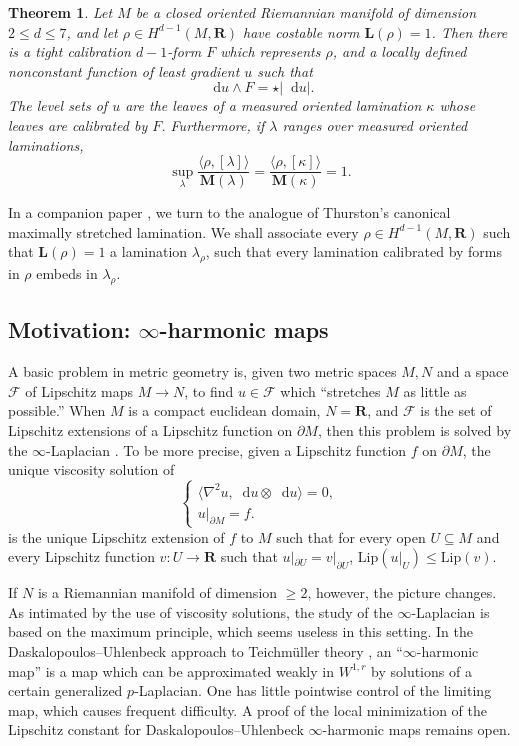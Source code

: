 \documentclass[reqno,11pt]{amsart}
\newcommand{\RR}{\mathbf{R}}
\newcommand*\dif{\mathop{}\!\mathrm{d}}
\newcommand{\Lip}{\mathrm{Lip}}
\newcommand{\Mass}{\mathbf M}
\newcommand{\Comass}{\mathbf L}
\newtheorem{theorem}{Theorem}[section]
\theoremstyle{definition}
\numberwithin{equation}{section}
\begin{document}
\begin{theorem}
Let $M$ be a closed oriented Riemannian manifold of dimension $2 \leq d \leq 7$, and let $\rho \in H^{d - 1}(M, \RR)$ have costable norm $\Comass(\rho) = 1$.
Then there is a tight calibration $d - 1$-form $F$ which represents $\rho$, and a locally defined nonconstant function of least gradient $u$ such that 
$$\dif u \wedge F = \star |\dif u|.$$
The level sets of $u$ are the leaves of a measured oriented lamination $\kappa$ whose leaves are calibrated by $F$.
Furthermore, if $\lambda$ ranges over measured oriented laminations, 
$$\sup_\lambda \frac{\langle \rho, [\lambda]\rangle}{\Mass(\lambda)} = \frac{\langle \rho, [\kappa]\rangle}{\Mass(\kappa)} = 1.$$
\end{theorem}

In a companion paper \cite{BackusBest2}, we turn to the analogue of Thurston's canonical maximally stretched lamination.
We shall associate every $\rho \in H^{d - 1}(M, \RR)$ such that $\Comass(\rho) = 1$ a lamination $\lambda_\rho$, such that every lamination calibrated by forms in $\rho$ embeds in $\lambda_\rho$.

\subsection{Motivation: \texorpdfstring{$\infty$-harmonic}{infinity-harmonic} maps}
A basic problem in metric geometry is, given two metric spaces $M, N$ and a space $\mathscr F$ of Lipschitz maps $M \to N$, to find $u \in \mathscr F$ which ``stretches $M$ as little as possible.''
When $M$ is a compact euclidean domain, $N = \RR$, and $\mathscr F$ is the set of Lipschitz extensions of a Lipschitz function on $\partial M$, then this problem is solved by the $\infty$-Laplacian \cite{Crandall2008}.
To be more precise, given a Lipschitz function $f$ on $\partial M$, the unique viscosity solution of
$$\begin{cases}
	\langle \nabla^2 u, \dif u \otimes \dif u\rangle = 0, \\
	u|_{\partial M} = f.
\end{cases}$$
is the unique Lipschitz extension of $f$ to $M$ such that for every open $U \subseteq M$ and every Lipschitz function $v: U \to \RR$ such that $u|_{\partial U} = v|_{\partial U}$, $\Lip(u|_U) \leq \Lip(v)$.

If $N$ is a Riemannian manifold of dimension $\geq 2$, however, the picture changes.
As intimated by the use of viscosity solutions, the study of the $\infty$-Laplacian is based on the maximum principle, which seems useless in this setting.
In the Daskalopoulos--Uhlenbeck approach to Teichm\"uller theory \cite{daskalopoulos2022,daskalopoulos2023}, an ``$\infty$-harmonic map'' is a map which can be approximated weakly in $W^{1, r}$ by solutions of a certain generalized $p$-Laplacian.
One has little pointwise control of the limiting map, which causes frequent difficulty.
A proof of the local minimization of the Lipschitz constant for Daskalopoulos--Uhlenbeck $\infty$-harmonic maps remains open.
\end{document}
